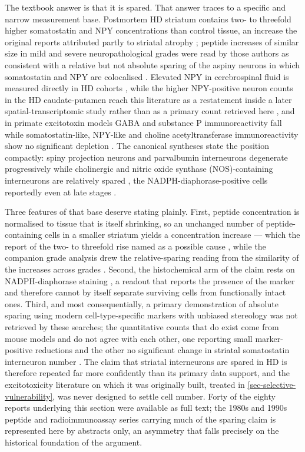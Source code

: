 \documentclass[11pt]{article}
\begin{document}
The textbook answer is that it is spared. That answer traces to a specific and narrow measurement base. Postmortem HD striatum contains two- to threefold higher somatostatin and NPY concentrations than control tissue, an increase the original reports attributed partly to striatal atrophy \citep{Beal1991b}; peptide increases of similar size in mild and severe neuropathological grades were read by those authors as consistent with a relative but not absolute sparing of the aspiny neurons in which somatostatin and NPY are colocalised \citep{Beal1988}. Elevated NPY in cerebrospinal fluid is measured directly in HD cohorts \citep{Wagner2016}, while the higher NPY-positive neuron counts in the HD caudate-putamen reach this literature as a restatement inside a later spatial-transcriptomic study rather than as a primary count retrieved here \citep{Burns2025}, and in primate excitotoxin models GABA and substance P immunoreactivity fall while somatostatin-like, NPY-like and choline acetyltransferase immunoreactivity show no significant depletion \citep{Ferrante1993}. The canonical syntheses state the position compactly: spiny projection neurons and parvalbumin interneurons degenerate progressively while cholinergic and nitric oxide synthase (NOS)-containing interneurons are relatively spared \citep{Morigaki2017}, the NADPH-diaphorase-positive cells reportedly even at late stages \citep{Mitchell1999}.

Three features of that base deserve stating plainly. First, peptide concentration is normalised to tissue that is itself shrinking, so an unchanged number of peptide-containing cells in a smaller striatum yields a concentration increase --- which the report of the two- to threefold rise named as a possible cause \citep{Beal1991b}, while the companion grade analysis drew the relative-sparing reading from the similarity of the increases across grades \citep{Beal1988}. Second, the histochemical arm of the claim rests on NADPH-diaphorase staining \citep{Brouillet1995,Beal1993}, a readout that reports the presence of the marker and therefore cannot by itself separate surviving cells from functionally intact ones. Third, and most consequentially, a primary demonstration of absolute sparing using modern cell-type-specific markers with unbiased stereology was not retrieved by these searches; the quantitative counts that do exist come from mouse models and do not agree with each other, one reporting small marker-positive reductions \citep{Rajput2011} and the other no significant change in striatal somatostatin interneuron number \citep{Rallapalle2021}. The claim that striatal interneurons are spared in HD is therefore repeated far more confidently than its primary data support, and the excitotoxicity literature on which it was originally built, treated in \ref{sec-selective-vulnerability}, was never designed to settle cell number. Forty of the eighty reports underlying this section were available as full text; the 1980s and 1990s peptide and radioimmunoassay series carrying much of the sparing claim is represented here by abstracts only, an asymmetry that falls precisely on the historical foundation of the argument.
\end{document}
